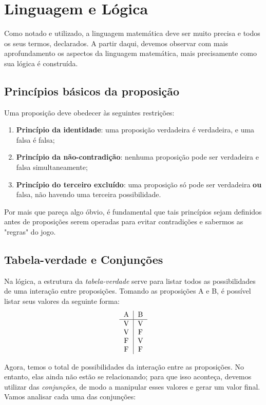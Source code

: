 \documentclass[13pt,letterpaper]{article}
\begin{document}
\section{Linguagem e Lógica}
Como notado e utilizado, a linguagem matemática deve ser muito precisa e todos os seus termos, declarados. A partir daqui, devemos observar com mais aprofundamento os aspectos da linguagem matemática, mais precisamente como sua lógica é construída.
\subsection{Princípios básicos da proposição}
Uma proposição deve obedecer às seguintes restrições:
\begin{enumerate}
    \item \textbf{Princípio da identidade}: uma proposição verdadeira é verdadeira, e uma falsa é falsa;
    \item \textbf{Princípio da não-contradição}: nenhuma proposição pode ser verdadeira e falsa simultaneamente; 
    \item \textbf{Princípio do terceiro excluído}: uma proposição só pode ser verdadeira \textbf{ou} falsa, não havendo uma terceira possibilidade.
\end{enumerate}
Por mais que pareça algo óbvio, é fundamental que tais princípios sejam definidos antes de proposições serem operadas para evitar contradições e sabermos as "regras" do jogo.
\subsection{Tabela-verdade e Conjunções}
Na lógica, a estrutura da \emph{tabela-verdade} serve para listar todos as possibilidades de uma interação entre proposições. Tomando as proposições A e B, é possível listar seus valores da seguinte forma: \\
\begin{align*}
\begin{tabular}{c|c}
A & B \\
\hline
V & V \\
V & F \\
F & V \\
F & F \\
\end{tabular}
\end{align*}

Agora, temos o total de possibilidades da interação entre as proposições. No entanto, elas ainda não estão se relacionando; para que isso aconteça, devemos utilizar das \emph{conjunções}, de modo a manipular esses valores e gerar um valor final. Vamos analisar cada uma das conjunções:
\end{document}
